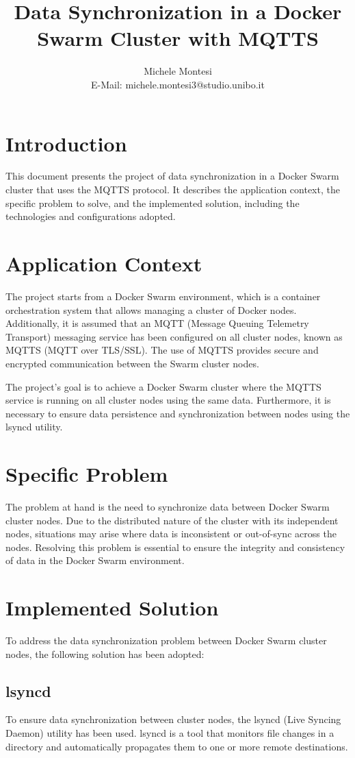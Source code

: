 \documentclass[a4paper, 12pt]{article}
\title{Data Synchronization in a Docker Swarm Cluster with MQTTS}
\author{Michele Montesi \\
        E-Mail: michele.montesi3@studio.unibo.it}
\begin{document}
\maketitle

\section{Introduction}
This document presents the project of data synchronization in a Docker Swarm cluster that uses 
the MQTTS protocol. It describes the application context, the specific problem 
to solve, and the implemented solution, including the technologies and configurations adopted.

\section{Application Context}
The project starts from a Docker Swarm environment, which is a container orchestration 
system that allows managing a cluster of Docker nodes. Additionally, it is assumed that an 
MQTT (Message Queuing Telemetry Transport) messaging service has been configured on all 
cluster nodes, known as MQTTS (MQTT over TLS/SSL). The use of MQTTS provides secure and 
encrypted communication between the Swarm cluster nodes.

The project's goal is to achieve a Docker Swarm cluster where the MQTTS service is 
running on all cluster nodes using the same data. Furthermore, it is necessary to ensure data 
persistence and synchronization between nodes using the lsyncd utility.

\newpage
\section{Specific Problem}
The problem at hand is the need to synchronize data between Docker Swarm cluster nodes. 
Due to the distributed nature of the cluster with its independent nodes, situations may 
arise where data is inconsistent or out-of-sync across the nodes. Resolving this problem 
is essential to ensure the integrity and consistency of data in the Docker Swarm environment.

\section{Implemented Solution}
To address the data synchronization problem between Docker Swarm cluster nodes, the 
following solution has been adopted:

\subsection{lsyncd}
To ensure data synchronization between cluster nodes, the lsyncd (Live Syncing Daemon) 
utility has been used. lsyncd is a tool that monitors file changes in a directory and 
automatically propagates them to one or more remote destinations.
\end{document}
